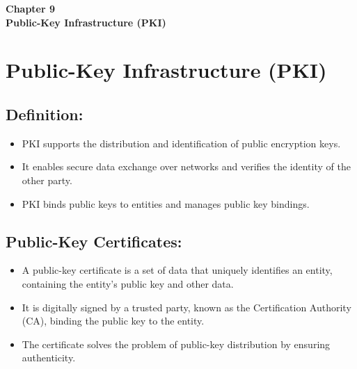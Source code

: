 \clearpage
\thispagestyle{empty} 
\begin{center}
    \vspace*{\fill} 
    \Huge \textbf{Chapter 9} \\
    \Huge \textbf{Public-Key Infrastructure (PKI)}
    \vspace*{\fill}
\end{center}
\clearpage
\fancyfoot[]{}
\chapter{Public-Key Infrastructure (PKI)}

\section{Definition:}
\begin{itemize}
    \item PKI supports the distribution and identification of public encryption keys.
    \item It enables secure data exchange over networks and verifies the identity of the other party.
    \item PKI binds public keys to entities and manages public key bindings.
\end{itemize}

\section{Public-Key Certificates:}
\begin{itemize}
    \item A public-key certificate is a set of data that uniquely identifies an entity, containing the entity’s public key and other data.
    \item It is digitally signed by a trusted party, known as the Certification Authority (CA), binding the public key to the entity.
    \item The certificate solves the problem of public-key distribution by ensuring authenticity.
\end{itemize}

